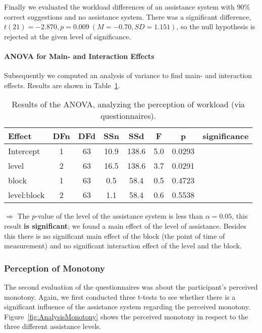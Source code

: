 		Finally we evaluated the workload differences of an assistance system with 90\% correct suggestions and no assistance system. There was a significant difference, \(t(21) = -2.870, p = 0.009\ (M = -0.70, SD = 1.151)\), so the null hypothesis is rejected at the given level of significance.

		\paragraph{ANOVA for Main- and Interaction Effects}
		Subsequently we computed an analysis of variance to find main- and interaction effects. Results are shown in Table~\ref{tab:anovaWorkload}.

		\begin{table}[H]\centering
			\caption{Results of the ANOVA, analyzing the perception of workload (via questionnaires).}
			\begin{tabular}{lccccccc}
				\toprule
				Effect & DFn & DFd & SSn & SSd & F & p & significance \\
				\midrule
				Intercept 	& 1 & 63 & 10.9 & 138.6 & 5.0 & 0.0293 & \Checkmark \\
				level				& 2 & 63 & 16.5 & 138.6 & 3.7  & 0.0291 & \Checkmark \\
				block 			& 1 & 63 & 0.5  & 58.4 & 0.5  & 0.4723 & \XSolidBrush \\
				level:block & 2 & 63 & 1.1 & 58.4 & 0.6 	& 0.5538 & \XSolidBrush \\
				\bottomrule
			\end{tabular}
			\label{tab:anovaWorkload}
		\end{table}
		\(\Rightarrow\) The \(p\)-value of the level of the assistance system is less than \(\alpha = 0.05\), this result \textbf{is significant}; we found a main effect of the level of assistance. Besides this there is no significant main effect of the block (the point of time of measurement) and no significant interaction effect of the level and the block.



	\subsubsection{Perception of Monotony}
		The second evaluation of the questionnaires was about the participant's perceived monotony. Again, we first conducted three t-tests to see whether there is a significant influence of the assistance system regarding the perceived monotony. Figure~\ref{fig:AnalysisMonotony} shows the perceived monotony in respect to the three different assistance levels.

